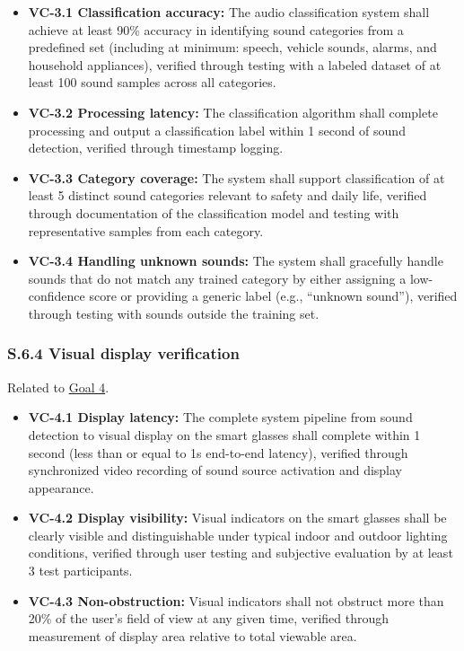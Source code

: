 \documentclass[12pt]{article}
\theoremstyle{definition}
\begin{document}
\begin{itemize}
\item \textbf{VC-3.1 Classification accuracy:} The audio classification system 
shall achieve at least 90\% accuracy in identifying sound categories from a 
predefined set (including at minimum: speech, vehicle sounds, alarms, and 
household appliances), verified through testing with a labeled dataset of at 
least 100 sound samples across all categories.

\item \textbf{VC-3.2 Processing latency:} The classification algorithm shall 
complete processing and output a classification label within 1 second of 
sound detection, verified through timestamp logging.

\item \textbf{VC-3.3 Category coverage:} The system shall support 
classification of at least 5 distinct sound categories relevant to safety 
and daily life, verified through documentation of the classification model 
and testing with representative samples from each category.

\item \textbf{VC-3.4 Handling unknown sounds:} The system shall gracefully 
handle sounds that do not match any trained category by either assigning a 
low-confidence score or providing a generic label (e.g., ``unknown sound''), 
verified through testing with sounds outside the training set.
\end{itemize}

\subsubsection{S.6.4 Visual display verification}

Related to \hyperref[goal:visual_display]{Goal 4}.

\begin{itemize}
\item \textbf{VC-4.1 Display latency:} The complete system pipeline from sound 
detection to visual display on the smart glasses shall complete within 1 
second (less than or equal to 1s end-to-end latency), verified through 
synchronized video recording of sound source activation and display appearance.

\item \textbf{VC-4.2 Display visibility:} Visual indicators on the smart 
glasses shall be clearly visible and distinguishable under typical indoor 
and outdoor lighting conditions, verified through user testing and subjective 
evaluation by at least 3 test participants.

\item \textbf{VC-4.3 Non-obstruction:} Visual indicators shall not obstruct 
more than 20\% of the user's field of view at any given time, verified 
through measurement of display area relative to total viewable area.
\end{itemize}
\end{document}
